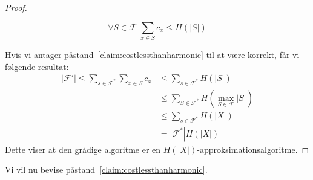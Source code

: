 \begin{proof}
	\begin{claim}
		\label{claim:costlessthanharmonic}
		\begin{equation*}
			\forall S \in \mathcal{F}	\;	\sum_{x \in S} c_{x} \le H(|S|)
		\end{equation*}
	\end{claim}
	Hvis vi antager påstand~\ref{claim:costlessthanharmonic} til at være korrekt, får vi følgende resultat:
	\begin{align*}
		|\mathcal{F}'| \le \sum_{s \in \mathcal{F}^{*}} \sum_{x \in S} c_{x} & \le \sum_{s \in \mathcal{F}^{*}} H(|S|)                          \\
		                                                                     & \le \sum_{S \in \mathcal{F}^{*}} H(\max_{S \in \mathcal{F}} |S|) \\
		                                                                     & \le \sum_{s \in \mathcal{F}^{*}} H(|X|)                          \\
		                                                                     & = |\mathcal{F}^{*}| H(|X|)
	\end{align*}
	Dette viser at den grådige algoritme er en $H(|X|)$-approksimationsalgoritme.
\end{proof}

Vi vil nu bevise påstand~\ref{claim:costlessthanharmonic}.

